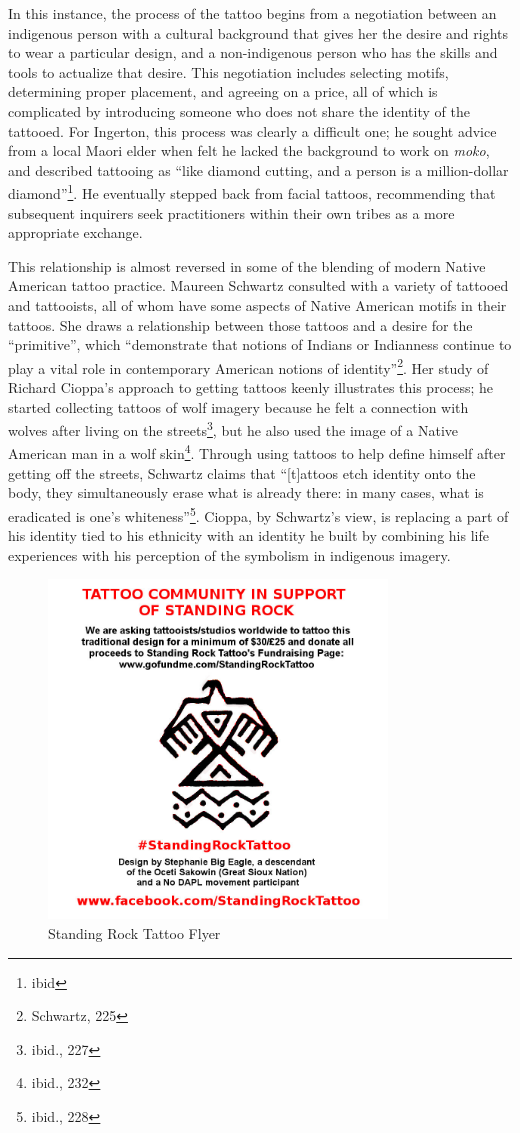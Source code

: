 In this instance, the process of the tattoo begins from a negotiation between an
indigenous person with a cultural background that gives her the desire and
rights to wear a particular design, and a non-indigenous person who has the
skills and tools to actualize that desire. This negotiation includes selecting
motifs, determining proper placement, and agreeing on a price, all of which is
complicated by introducing someone who does not share the identity of the
tattooed. For Ingerton, this process was clearly a difficult one; he sought
advice from a local Maori elder when felt he lacked the background to work on
\textit{moko}, and described tattooing as ``like diamond cutting, and a person
is a million-dollar diamond''\footnote{ibid}. He eventually stepped back from
facial tattoos, recommending that subsequent inquirers seek practitioners within
their own tribes as a more appropriate exchange.

This relationship is almost reversed in some of the blending of modern Native
American tattoo practice. Maureen Schwartz consulted with a variety of tattooed
and tattooists, all of whom have some aspects of Native American motifs in their
tattoos. She draws a relationship between those tattoos and a desire for the
``primitive'', which ``demonstrate that notions of Indians or Indianness
continue to play a vital role in contemporary American notions of
identity''\footnote{Schwartz, 225}. Her study of Richard Cioppa's approach to
getting tattoos keenly illustrates this process; he started collecting tattoos
of wolf imagery because he felt a connection with wolves after living on the
streets\footnote{ibid., 227}, but he also used the image of a Native American
man in a wolf skin\footnote{ibid., 232}. Through using tattoos to help define
himself after getting off the streets, Schwartz claims that ``[t]attoos etch
identity onto the body, they simultaneously erase what is already there: in many
cases, what is eradicated is one's whiteness''\footnote{ibid., 228}. Cioppa, by
Schwartz's view, is replacing a part of his identity tied to his ethnicity with
an identity he built by combining his life experiences with his perception of
the symbolism in indigenous imagery.

\begin{figure}[ht!]
  \centering
  \includegraphics[width=90mm]{standingrock.jpg}
  \caption{Standing Rock Tattoo Flyer\label{overflow}}
\end{figure}

